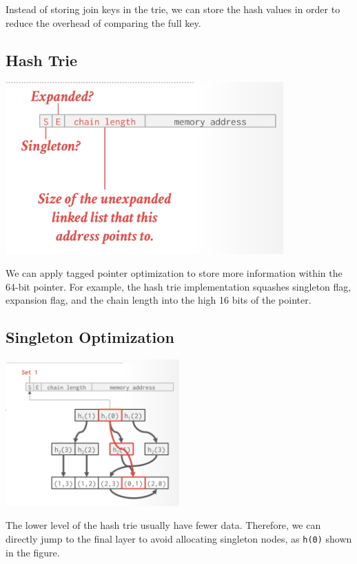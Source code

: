 \documentclass[11pt]{article}
\begin{document}
Instead of storing join keys in the trie, we can store the hash values in order to reduce the overhead of comparing the
full key.\cite{freitag2020adopting}

\subsection{Hash Trie}

\begin{center}
    \includegraphics[width=0.8\textwidth]{img/figure4.png}
\end{center}

We can apply tagged pointer optimization to store more information within the 64-bit pointer.
For example, the hash trie implementation squashes singleton flag, expansion flag, and the chain
length into the high 16 bits of the pointer.\cite{freitag2020adopting}


\subsection{Singleton Optimization}

\begin{center}
    \includegraphics[width=0.5\textwidth]{img/figure5.png}
\end{center}

The lower level of the hash trie usually have fewer data. Therefore, we can directly jump to the final layer to avoid
allocating singleton nodes, as \texttt{h(0)} shown in the figure.\cite{freitag2020adopting}
\end{document}
